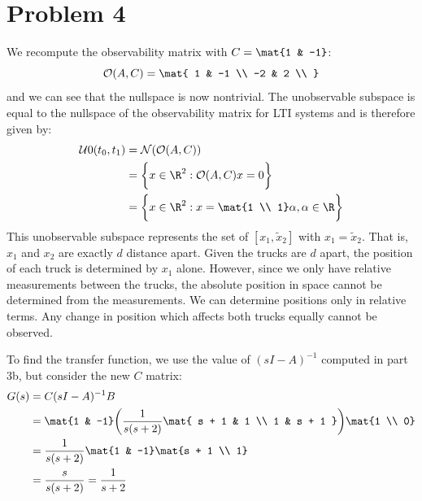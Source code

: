 \documentclass{homework}
\newcommand{\obs}{\mathcal{O}}
\begin{document}
\section{Problem 4}

\begin{letterenum}
\item We recompute the observability matrix with $C = \mat{1 & -1}$:
\begin{equation*}
    \obs (A, C) = \mat{
        1 & -1 \\
        -2 & 2 \\
    }
\end{equation*}
and we can see that the nullspace is now nontrivial. The unobservable
subspace is equal to the nullspace of the observability matrix
for LTI systems and is therefore given by:
\begin{align*}
    \mathcal{U}0(t_0, t_1) &= \mathcal{N}(\obs(A, C)) \\
        &= \biggl\{
            x \in \R^2: \obs(A, C)x = 0
        \biggr\} \\
        &= \biggl\{
            x\in\R^2: x = \mat{1 \\ 1} \alpha, \alpha \in \R
        \biggr\}
\end{align*}
This unobservable subspace represents the set of $[x_1, \tilde{x}_2]$
with $x_1 = \tilde{x}_2$. That is, $x_1$ and $x_2$ are exactly $d$
distance apart. Given the trucks are $d$ apart, the position
of each truck is determined by $x_1$ alone. However, since we only
have relative measurements between the trucks, the absolute
position in space cannot be determined from the measurements.
We can determine positions only in relative terms. Any change 
in position which affects both trucks equally cannot be observed.

\item To find the transfer function, we use the value of $(sI - A)^{-1}$
computed in part 3b, but consider the new $C$ matrix:
\begin{align*}
    G(s) &= C(sI - A)^{-1} B \\
        &= \mat{1 & -1} \biggl(
            \frac{1}{s(s+2)} \mat{
                s + 1 & 1 \\
                1 & s + 1
            }
        \biggr) \mat{1 \\ 0} \\
        &= \frac{1}{s(s+2)} \mat{1 & -1} \mat{s + 1 \\ 1} \\
        &= \frac{s}{s(s+2)} = \frac{1}{s+2}
\end{align*}


\end{letterenum}
\end{document}
